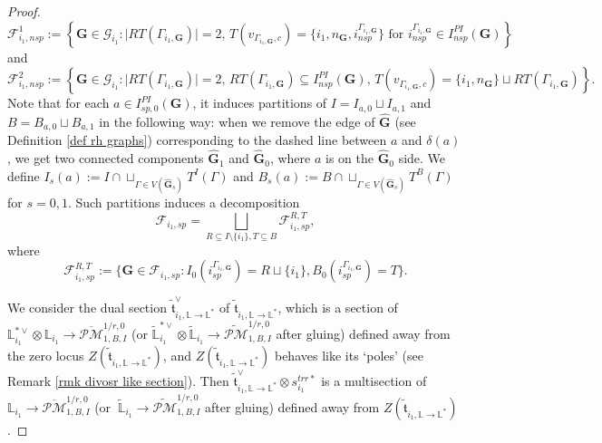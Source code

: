 \documentclass[11pt]{amsart}
\theoremstyle{definition}
\theoremstyle{remark}
\newcommand{\oPMb}{{\overline{\mathcal{PM}}}}
\newcommand{\nontilde}{}
\newcommand{\<}{\left<}
\renewcommand{\>}{\right>}
\numberwithin{equation}{section}
\begin{document}
\begin{proof}
         \begin{equation*}
            \bm{\mathcal F}^1_{i_1,nsp}:=\left\{ \bm{G}\in \bm{\mathcal G}_{i_1} \colon \text{$\lvert RT(\Gamma_{i_1,\bm{G}})\rvert=2$, $T(v_{\Gamma_{i_1,\bm{G}},c})=\{i_1,n_{\bm{G}},i^{\Gamma_{i_1,\bm{G}}}_{nsp}\}$ for $i^{\Gamma_{i_1,\bm{G}}}_{nsp}\in I^{PI}_{nsp}(\bm{G})$}\right \}
        \end{equation*}
        and 
        \begin{equation*}
            \bm{\mathcal F}^2_{i_1,nsp}:=\left\{ \bm{G}\in \bm{\mathcal G}_{i_1} \colon \text{$\lvert RT(\Gamma_{i_1,\bm{G}})\rvert=2$, $RT(\Gamma_{i_1,\bm{G}})\subseteq I^{PI}_{nsp}(\bm{G})$,  $T(v_{\Gamma_{i_1,\bm{G}},c})=\{i_1,n_{\bm{G}}\}\sqcup RT(\Gamma_{i_1,\bm{G}}) $}\right \}.
        \end{equation*}
        Note %
that for each $a\in I^{PI}_{sp,0}({\bm{G}})$, it induces  partitions of $I=I_{a,0}\sqcup I_{a,1}$ and $B=B_{a,0}\sqcup B_{a,1}$ in the following way:  when we remove the edge of $\hat{\bm{G}}$ (see Definition \ref{def rh graphs}) corresponding to the dashed line between $a$ and $\delta(a)$, we get two connected components $\hat{\bm{G}}_1$ and $\hat{\bm{G}}_0$, where $a$ is on the $\hat{\bm{G}}_0$ side. We define 
        $I_{s}(a):=I\cap \sqcup_{\Gamma\in V(\hat{\bm{G}}_s)} T^I(\Gamma)$ and $B_{s}(a):=B\cap \sqcup_{\Gamma\in V(\hat{\bm{G}}_s)} T^B(\Gamma)$ for $s=0,1$. Such partitions induces a decomposition 
        $$
        \bm{\mathcal F}_{i_1,sp}=\bigsqcup_{R\subseteq I\setminus\{i_1\}, T\subseteq B} \bm{\mathcal F}_{i_1,sp}^{R,T},
        $$
        where
        $$
       \bm{\mathcal F}_{i_1,sp}^{R,T}:=\{\bm{G} \in  \bm{\mathcal F}_{i_1,sp}\colon I_{0}(i_{sp}^{\Gamma_{i_1,\bm{G}}})=R\sqcup \{i_1\}, B_{0}(i_{sp}^{\Gamma_{i_1,\bm{G}}})=T \}.
        $$

        We consider the dual section $\tilde{\mathfrak{t}}^{\vee}_{i_1,\mathbb L \to \mathbb L^*}$ of $\tilde{\mathfrak{t}}_{i_1,\mathbb L \to \mathbb L^*}$, which is a section  of  ${\mathbb L}^{*\vee}_{i_1}\otimes {\mathbb L}_{i_1}\to  \oPMb^{1/r,0}_{1,B,I}$ (or $\widetilde{\mathbb L}^{*\vee}_{i_1}\otimes \widetilde{\mathbb L}_{i_1} \to \widetilde{\mathcal{PM}}^{1/r,0}_{1,B,I}$ after gluing) defined away from the zero locus $Z(\tilde{\mathfrak{t}}_{i_1,\mathbb L \to \mathbb L^*})$, and $Z(\tilde{\mathfrak{t}}_{i_1,\mathbb L \to \mathbb L^*})$ behaves like its `poles' (see Remark \ref{rmk divosr like section}). Then $\tilde{\mathfrak{t}}^{\vee}_{i_1,\mathbb L \to \mathbb L^*}\otimes
        \nontilde{s}^{trr*}_{i_1}$ is a multisection of  $ {\mathbb L}_{i_1}\to  \oPMb^{1/r,0}_{1,B,I}$ (or $\ \widetilde{\mathbb L}_{i_1} \to \widetilde{\mathcal{PM}}^{1/r,0}_{1,B,I}$ after gluing) defined away from $Z(\tilde{\mathfrak{t}}_{i_1,\mathbb L \to \mathbb L^*})$.


\end{proof}
\end{document}
